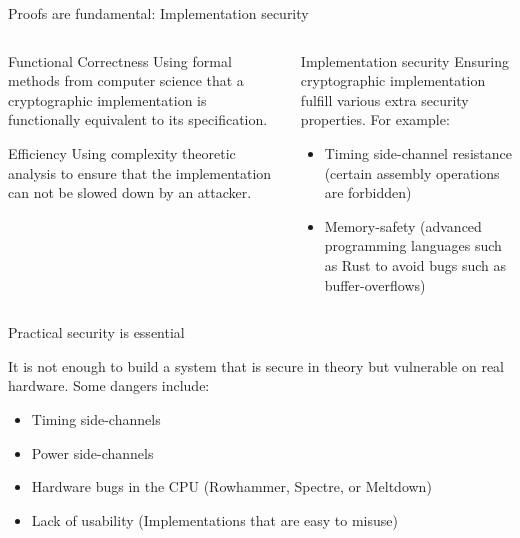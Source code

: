 \begin{frame}{Proofs are fundamental: Implementation security}
  \begin{columns}[t,fullwidth]

    \begin{column}{.40\textwidth}
      \begin{block}{Functional Correctness}
        Using formal methods from computer science that a cryptographic implementation is functionally equivalent to its specification.
      \end{block}
      
      \vfill

      \begin{block}{Efficiency}
        Using complexity theoretic analysis to ensure that the implementation can not be slowed down by an attacker.
      \end{block}
    \end{column}

    \begin{column}{.55\textwidth}
      \begin{block}{Implementation security}
        Ensuring cryptographic implementation fulfill various extra security properties.
        For example:
        \vfill
        \begin{itemize}
          \item Timing side-channel resistance (certain assembly operations are forbidden)
          \item Memory-safety (advanced programming languages such as Rust to avoid bugs such as buffer-overflows)
        \end{itemize}
      \end{block}
    \end{column}
  \end{columns}

\end{frame}

\begin{frame}{Practical security is essential}
  \small

  It is not enough to build a system that is secure in theory but vulnerable on real hardware.
  Some dangers include:

  \begin{itemize}
    \item Timing side-channels
    \item Power side-channels
    \item Hardware bugs in the CPU (Rowhammer, Spectre, or Meltdown)
    \item Lack of usability (Implementations that are easy to misuse)
  \end{itemize}
\end{frame}

